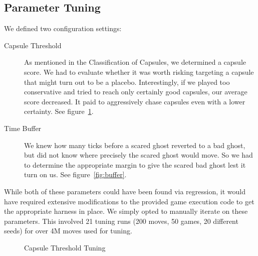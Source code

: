 \documentclass[11pt, oneside]{article}   	%
\begin{document}
\subsection{Parameter Tuning}
We defined two configuration settings:
\begin{description}
	\item[Capsule Threshold]As mentioned in the Classification of Capsules, we determined a capsule score. We had to evaluate whether it was worth risking targeting a capsule that might turn out to be a placebo. Interestingly, if we played too conservative and tried to reach only certainly good capsules, our average score decreased. It paid to aggressively chase capsules even with a lower certainty. See figure~\ref{fig:threshold}.
	\item[Time Buffer]We knew how many ticks before a scared ghost reverted to a bad ghost, but did not know where precisely the scared ghost would move. So we had to determine the appropriate margin to give the scared bad ghost lest it turn on us. See figure~\ref{fig:buffer}.
\end{description}
While both of these parameters could have been found via regression, it would have required extensive modifications to the provided game execution code to get the appropriate harness in place. We simply opted to manually iterate on these parameters. This involved 21 tuning runs (200 moves, 50 games, 20 different seeds) for over 4M moves used for tuning.
\begin{figure}[h!]
  \centering
  \caption{Capsule Threshold Tuning}
  \label{fig:threshold}
 \end{figure}
\end{document}
